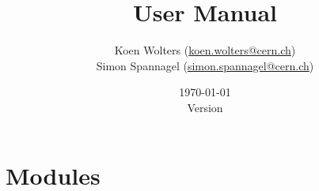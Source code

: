 \documentclass[fontsize=12pt, parskip=half]{scrartcl}
\title{\apsqbold User Manual} %
\author{Koen Wolters (\href{mailto:koen.wolters@cern.ch}{koen.wolters@cern.ch})\\
  Simon Spannagel (\href{mailto:simon.spannagel@cern.ch}{simon.spannagel@cern.ch})
} %
\date{\today\\ \vspace{10pt} Version \version} %
\begin{document}
\maketitle %

\begin{abstract}
\end{abstract}

\clearpage
\tableofcontents

\clearpage


\clearpage


\clearpage


\clearpage


\clearpage


\clearpage


\clearpage

\section{Modules}
\label{sec:modules}

\lstset{language=Ini}
\lstset{language=}
\clearpage


\clearpage


\clearpage


\clearpage


\clearpage

\appendix

% 

\clearpage
{}
\addreferencesline
\printbibliography
\end{document}
